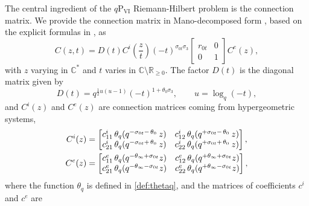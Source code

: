 \documentclass[a4paper,reqno,11pt]{amsart}
\numberwithin{equation}{section}
\numberwithin{figure}{section}
\theoremstyle{plain}
\theoremstyle{remark}
\newcommand\Psix{\textrm{P}_{\textrm{VI}}}
\numberwithin{rhp}{section}
\begin{document}
The central ingredient of the $q\Psix$ Riemann-Hilbert problem is the connection matrix.
We provide the connection matrix in Mano-decomposed form \cite{mano_qpvi,ORS20}, based on the explicit formulas in \cite[\S 4.3]{roffelsen2024segre}, as
\begin{equation}\label{eq:connectionfactorisation}
    C(z,t)=D(t)C^i\left(\frac{z}{t}\right)(-t)^{\sigma_{0t} \sigma_3} \begin{bmatrix}r_{0t} & 0\\
    0 & 1\end{bmatrix}C^e(z),
\end{equation}
with $z$ varying in $\mathbb{C}^*$ and $t$ varies in $\mathbb{C}\setminus\mathbb{R}_{\geq 0}$. The factor $D(t)$ is the diagonal matrix given by
\begin{equation}\label{eq:defi_D}
    D(t)=q^{\frac{1}{2}u(u-1)} (-t)^{1+\theta_0\sigma_3},\qquad u=\log_q(-t),
\end{equation}
and $C^i(z)$ and $C^e(z)$ are connection matrices coming from hypergeometric systems,
\begin{align*}
     C^i(z)&=
    \begin{bmatrix}
   c_{11}^i\,\theta_q(q^{-\sigma_{0t}-\hspace{0.4mm}\theta_0\hspace{0.7mm}}z) &  c_{12}^i\,\theta_q(q^{+\sigma_{0t}-\hspace{0.4mm}\theta_0\hspace{0.7mm}}z)\\
    c_{21}^i\,\theta_q(q^{-\sigma_{0t}+\hspace{0.4mm}\theta_0\hspace{0.7mm}}z) &  c_{22}^i\,\theta_q(q^{+\sigma_{0t}+\hspace{0.4mm}\theta_0\hspace{0.7mm}}z)\\
    \end{bmatrix},\\
        C^e(z)&=
    \begin{bmatrix}
   c_{11}^e\,\theta_q(q^{-\theta_\infty+\sigma_{0t}}z) &  c_{12}^e\,\theta_q(q^{+\theta_\infty+\sigma_{0t}}z)\\
    c_{21}^e\,\theta_q(q^{-\theta_\infty-\sigma_{0t}}z) &  c_{22}^e\,\theta_q(q^{+\theta_\infty-\sigma_{0t}}z)\\
    \end{bmatrix},
\end{align*}
where the function $\theta_q$ is defined in \eqref{def:thetaq}, and the matrices of coefficients $c^i$ and $c^e$ are
\end{document}
